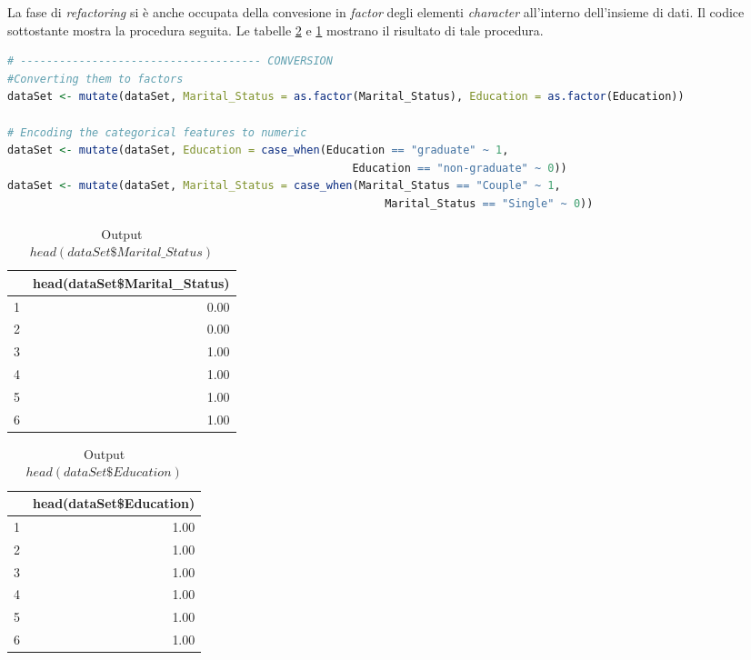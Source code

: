 \documentclass[letterpaper,11pt]{article}
\begin{document}
La fase di \textit{refactoring} si è anche occupata della convesione in \textit{factor} degli elementi \textit{character} all'interno dell'insieme di dati.
Il codice sottostante mostra la procedura seguita. Le tabelle \ref{fig:head(dataSetEducation)} e \ref{fig:head(dataSetMaritalStatus)} mostrano il risultato di tale procedura.
\begin{lstlisting}[language=R]
# ------------------------------------- CONVERSION
#Converting them to factors
dataSet <- mutate(dataSet, Marital_Status = as.factor(Marital_Status), Education = as.factor(Education))

# Encoding the categorical features to numeric
dataSet <- mutate(dataSet, Education = case_when(Education == "graduate" ~ 1,
                                                     Education == "non-graduate" ~ 0))
dataSet <- mutate(dataSet, Marital_Status = case_when(Marital_Status == "Couple" ~ 1,
                                                          Marital_Status == "Single" ~ 0))
\end{lstlisting}

\begin{table}[H]
\centering
\begin{tabular}{rr}
  \hline
 & head(dataSet\$Marital\_Status) \\ 
  \hline
1 & 0.00 \\ 
  2 & 0.00 \\ 
  3 & 1.00 \\ 
  4 & 1.00 \\ 
  5 & 1.00 \\ 
  6 & 1.00 \\ 
   \hline
\end{tabular}
\caption{Output $head(dataSet\$Marital\_Status)$}
\label{fig:head(dataSetMaritalStatus)}
\end{table}
\begin{table}[H]
\centering
\begin{tabular}{rr}
  \hline
 & head(dataSet\$Education) \\ 
  \hline
1 & 1.00 \\ 
  2 & 1.00 \\ 
  3 & 1.00 \\ 
  4 & 1.00 \\ 
  5 & 1.00 \\ 
  6 & 1.00 \\ 
   \hline
\end{tabular}
\caption{Output $head(dataSet\$Education)$}
\label{fig:head(dataSetEducation)}
\end{table}
\end{document}
